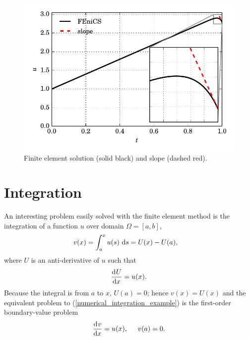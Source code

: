   \begin{figure}
    \centering
      \includegraphics[width=\linewidth]{images/fenics_intro/1D_BVP_2.pdf}
    \caption[BVP example one solution]{Finite element solution (solid black) and slope (dashed red).}
    \label{1d_bvp_2_image}
  \end{figure}


  \section{Integration} \label{ssn_integration}
  
  An interesting problem easily solved with the finite element method is the integration of a function $u$ over domain $\Omega = [a,b]$,
  \begin{align}
    \label{numerical_integration_example}
    v(x) &= \int_a^x u(s) \ \mathrm{d}s = U(x) - U(a),
  \end{align}
  where $U$ is an anti-derivative of $u$ such that
  \begin{align*}
    \frac{\mathrm{d}^{} U}{\mathrm{d} x^{} } = u(x).
  \end{align*}
  Because the integral is from $a$ to $x$, $U(a) = 0$; hence $v(x) = U(x)$ and the equivalent problem to (\ref{numerical_integration_example}) is the first-order boundary-value problem
  \begin{align}
    \label{1d_example_4}
    \frac{\mathrm{d}^{} v}{\mathrm{d} x^{} } = u(x), \hspace{5mm} v(a) = 0.
  \end{align}

